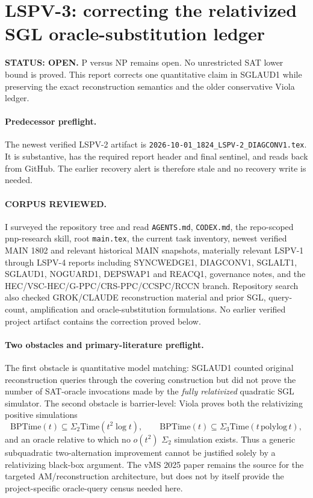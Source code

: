 \documentclass[11pt]{article}
\begin{document}
\section*{LSPV-3: correcting the relativized SGL oracle-substitution ledger}

\textbf{STATUS: OPEN.} P versus NP remains open. No unrestricted SAT lower bound is proved. This report corrects one quantitative claim in SGLAUD1 while preserving the exact reconstruction semantics and the older conservative Viola ledger.

\paragraph{Predecessor preflight.}
The newest verified LSPV-2 artifact is \texttt{2026-10-01\_1824\_LSPV-2\_DIAGCONV1.tex}. It is substantive, has the required report header and final sentinel, and reads back from GitHub. The earlier recovery alert is therefore stale and no recovery write is needed.

\paragraph{CORPUS REVIEWED.}
I surveyed the repository tree and read \texttt{AGENTS.md}, \texttt{CODEX.md}, the repo-scoped pnp-research skill, root \texttt{main.tex}, the current task inventory, newest verified MAIN 1802 and relevant historical MAIN snapshots, materially relevant LSPV-1 through LSPV-4 reports including SYNCWEDGE1, DIAGCONV1, SGLALT1, SGLAUD1, NOGUARD1, DEPSWAP1 and REACQ1, governance notes, and the HEC/VSC-HEC/G-PPC/CRS-PPC/CCSPC/RCCN branch. Repository search also checked GROK/CLAUDE reconstruction material and prior SGL, query-count, amplification and oracle-substitution formulations. No earlier verified project artifact contains the correction proved below.

\paragraph{Two obstacles and primary-literature preflight.}
The first obstacle is quantitative model matching: SGLAUD1 counted original reconstruction queries through the covering construction but did not prove the number of SAT-oracle invocations made by the \emph{fully relativized} quadratic SGL simulator. The second obstacle is barrier-level: Viola proves both the relativizing positive simulations
\[
\mathrm{BPTime}(t)\subseteq\Sigma_2\mathrm{Time}(t^2\log t),
\qquad
\mathrm{BPTime}(t)\subseteq\Sigma_3\mathrm{Time}(t\,\mathrm{polylog}\,t),
\]
and an oracle relative to which no \(o(t^2)\) \(\Sigma_2\) simulation exists. Thus a generic subquadratic two-alternation improvement cannot be justified solely by a relativizing black-box argument. The vMS 2025 paper remains the source for the targeted AM/reconstruction architecture, but does not by itself provide the project-specific oracle-query census needed here.
\end{document}
